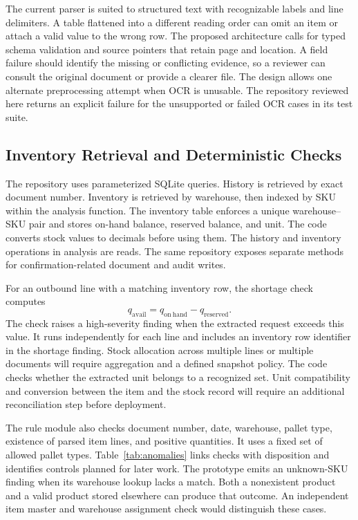\documentclass[conference]{IEEEtran}
\begin{document}
The current parser is suited to structured text with recognizable labels and line delimiters. A table flattened into a different reading order can omit an item or attach a valid value to the wrong row. The proposed architecture calls for typed schema validation and source pointers that retain page and location. A field failure should identify the missing or conflicting evidence, so a reviewer can consult the original document or provide a clearer file. The design allows one alternate preprocessing attempt when OCR is unusable. The repository reviewed here returns an explicit failure for the unsupported or failed OCR cases in its test suite.

\subsection{Inventory Retrieval and Deterministic Checks}
The repository uses parameterized SQLite queries. History is retrieved by exact document number. Inventory is retrieved by warehouse, then indexed by SKU within the analysis function. The inventory table enforces a unique warehouse--SKU pair and stores on-hand balance, reserved balance, and unit. The code converts stock values to decimals before using them. The history and inventory operations in analysis are reads. The same repository exposes separate methods for confirmation-related document and audit writes.

For an outbound line with a matching inventory row, the shortage check computes
\begin{equation}
q_{\mathrm{avail}} = q_{\mathrm{on\ hand}} - q_{\mathrm{reserved}}.
\label{eq:available}
\end{equation}
The check raises a high-severity finding when the extracted request exceeds this value. It runs independently for each line and includes an inventory row identifier in the shortage finding. Stock allocation across multiple lines or multiple documents will require aggregation and a defined snapshot policy. The code checks whether the extracted unit belongs to a recognized set. Unit compatibility and conversion between the item and the stock record will require an additional reconciliation step before deployment.

The rule module also checks document number, date, warehouse, pallet type, existence of parsed item lines, and positive quantities. It uses a fixed set of allowed pallet types. Table~\ref{tab:anomalies} links checks with disposition and identifies controls planned for later work. The prototype emits an unknown-SKU finding when its warehouse lookup lacks a match. Both a nonexistent product and a valid product stored elsewhere can produce that outcome. An independent item master and warehouse assignment check would distinguish these cases.
\end{document}

